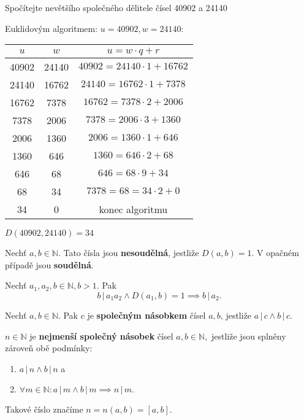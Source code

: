 \begin{priklad}
  Spočítejte nevětšího společného dělitele čísel 40902 a 24140
\end{priklad}

\begin{reseni}
  Euklidovým algoritmem: $u = 40902, w = 24140:$
  \begin{center}
    \begin{tabular}{c | c | c}
      $u$ & $w$ & $u=w\cdot q+r$  \\
      \hline
      40902 & 24140 & $40902 = 24140\cdot1 + 16762$ \\
      24140 & 16762 & $24140 = 16762\cdot1 + 7378$ \\
      16762 & 7378 & $16762 = 7378\cdot2 + 2006$  \\
      7378 & 2006 & $7378 = 2006\cdot3 + 1360$  \\
      2006 & 1360 & $2006 = 1360\cdot1 + 646$  \\
      1360 & 646 & $1360 = 646\cdot2 + 68$  \\
      646 & 68 & $646 = 68\cdot9 + 34$  \\
      68 & 34 & $7378 = 68 = 34\cdot2 + 0$  \\
      34 & 0 & konec algoritmu  \\
    \end{tabular}
  \end{center}
  $D(40902, 24140) = 34$
\end{reseni}

\begin{definition}
  Nechť $a,b\in \mathbb N.$ Tato čísla jsou \textbf{nesoudělná}, jestliže $D(a,b)=1$. V opačném případě jsou \textbf{soudělná}.
\end{definition}

\begin{veta}
  Nechť $a_1,a_2,b\in \mathbb N, b>1.$ Pak
  $$b \, | \, a_1a_2 \land D(a_1,b)=1\implies b\, | \, a_2.$$
\end{veta}

\begin{definition}
  Nechť $a,b\in \mathbb N.$ Pak $c$ je \textbf{společným násobkem} čísel $a,b$, jestliže $a \, | \, c \land b\, | \, c.$
\end{definition}

\begin{definition}
  $n\in \mathbb N$ je \textbf{nejmenší společný násobek} čísel $a,b \in \mathbb N,$ jestliže jsou splněny zároveň obě podmínky:
  \begin{enumerate}[$i.$]
    \item $a\, | \, n \land b \, | \, n$ a
    \item $\forall m \in \mathbb N: a \, | \, m \land b \, | \, m \implies n \, | \, m.$
  \end{enumerate}
  Takové číslo značíme $n=n(a,b)=\left [ a,b\right ] .$
\end{definition}

